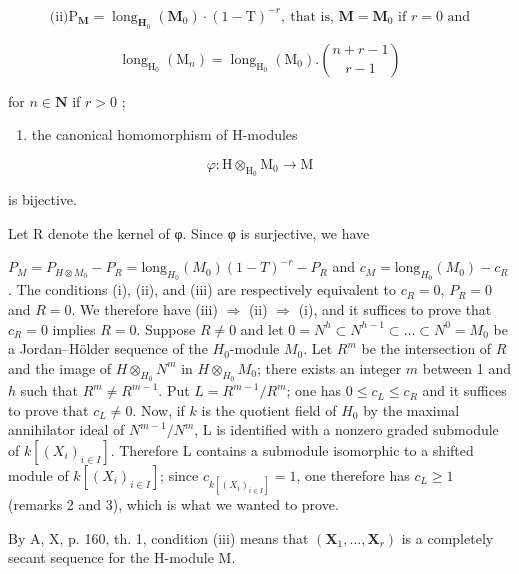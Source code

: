 \[
\text{(ii)} \mathrm{P}_{\mathbf{M}} = \operatorname{long}_{\mathbf{H}_{0}}(\mathbf{M}_{0}) \cdot (1 - \mathrm{T})^{-r},\ \text{that is, }\mathbf{M} = \mathbf{M}_{0}\text{ if }r=0\text{ and}
\]

\[
\operatorname{long} _ {\mathrm{H} _ {0}} \left(\mathrm{M} _ {n}\right) = \operatorname{long} _ {\mathrm{H} _ {0}} \left(\mathrm{M} _ {0}\right). \binom {n + r - 1} {r - 1}
\]

for \(n \in \mathbf{N}\) if \(r > 0\) ;

\begin{enumerate}
\def\labelenumi{(\roman{enumi})}
\setcounter{enumi}{2}
\tightlist
\item
  the canonical homomorphism of H-modules
\end{enumerate}

\[
\varphi : \mathrm{H} \otimes_ {\mathrm{H} _ {0}} \mathrm{M} _ {0} \rightarrow \mathrm{M}
\]

is bijective.

Let R denote the kernel of φ. Since φ is surjective, we have

\(P_{M} = P_{H \otimes M_{0}} - P_{R} = \text{long}_{H_{0}}(M_{0})(1 - T)^{-r} - P_{R}\) and \(c_{M} = \text{long}_{H_{0}}(M_{0}) - c_{R}\). The conditions (i), (ii), and (iii) are respectively equivalent to \(c_{R} = 0\), \(P_{R} = 0\) and \(R = 0\). We therefore have (iii) \(\Rightarrow\) (ii) \(\Rightarrow\) (i), and it suffices to prove that \(c_{R} = 0\) implies \(R = 0\). Suppose \(R \neq 0\) and let \(0 = N^{h} \subset N^{h-1} \subset \ldots \subset N^{0} = M_{0}\) be a Jordan–Hölder sequence of the \(H_{0}\)-module \(M_{0}\). Let \(R^{m}\) be the intersection of \(R\) and the image of \(H \otimes_{H_{0}} N^{m}\) in \(H \otimes_{H_{0}} M_{0}\); there exists an integer \(m\) between 1 and \(h\) such that \(R^{m} \neq R^{m-1}\). Put \(L = R^{m-1}/R^{m}\); one has \(0 \leqslant c_{L} \leqslant c_{R}\) and it suffices to prove that \(c_{L} \neq 0\). Now, if \(k\) is the quotient field of \(H_{0}\) by the maximal annihilator ideal of \(N^{m-1}/N^{m}\), L is identified with a nonzero graded submodule of \(k[(X_{i})_{i\in I}]\). Therefore L contains a submodule isomorphic to a shifted module of \(k[(X_{i})_{i\in I}]\); since \(c_{k[(X_{i})_{i\in I}]} = 1\), one therefore has \(c_{L} \geqslant 1\) (remarks 2 and 3), which is what we wanted to prove.

By A, X, p. 160, th. 1, condition (iii) means that \((\mathbf{X}_{1}, \ldots, \mathbf{X}_{r})\) is a completely secant sequence for the H-module M.

